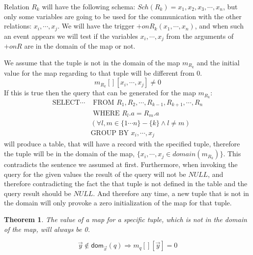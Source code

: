\documentclass[12pt]{article}
\newtheorem{theorem}{Theorem}
\newcommand{\dom}{\textsf{dom}}
\begin{document}
Relation $R_k$ will have the following schema: $Sch(R_k)={x_1,x_2,x_3,\cdots,x_n}$, but only some variables are going to be used for the communication with the other relations: $x_i,\cdots,x_j$. We will have the trigger $+onR_k(x_1,\cdots,x_n)$, and when such an event appears we will test if the variables $x_i,\cdots,x_j$ from the arguments of $+onR$ are in the domain of the map or not. 
	
We assume that the tuple is not in the domain of the map $m_{R_k}$ and the initial value for the map regarding to that tuple will be different from 0.
$$m_{R_k}[][x_i,\cdots,x_j]\not= 0$$
If this is true then the query that can be generated for the map $m_{R_k}$:
\begin{align*}
\mbox{SELECT}\cdots&\mbox{ FROM }R_1,R_2,\cdots,R_{k-1},R_{k+1},\cdots,R_n\\
&\mbox{ WHERE }R_l.a=R_m.a\\
&(\forall l,m\in\{1\cdots n\}-\{k\}\land l\not=m)\\
&\mbox{GROUP BY } x_i,\cdots,x_j
\end{align*}
will produce a table, that will have a record with the specified tuple, therefore the tuple will be in the domain of the map, $\{x_i,\cdots,x_j\in domain(m_{R_k}) \}$. This contradicts the sentence we assumed at first. Furthermore, when invoking the query for the given values the result of the query will not be $NULL$, and therefore contradicting the fact the that tuple is not defined in the table and the query result should be $NULL$. And therefore any time, a new tuple that is not in the domain will only provoke a zero initialization of the map for that tuple.

\begin{theorem}
\label{thm:1}
The value of a map for a specific tuple, which is not in the domain of the map, will always be 0.
\end{theorem}
$$\vec{y}\notin\dom{}_{\vec{x}}(q)\Rightarrow m_q[][\vec{y}]=0$$
\end{document}
